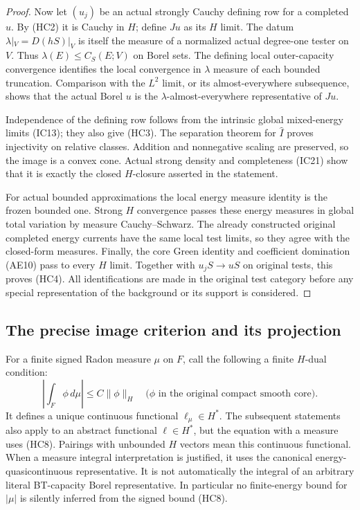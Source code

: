 \documentclass[11pt,a4paper]{article}
\numberwithin{equation}{section}
\theoremstyle{definition}
\theoremstyle{remark}
\begin{document}
\begin{proof}
Now let $(u_j)$ be an actual strongly Cauchy defining row for
a completed $u$. By (HC2) it is Cauchy in $H$; define $Ju$
as its $H$ limit. The datum $\lambda|_V=D(hS)|_V$ is itself
the measure of a normalized actual degree-one tester on $V$.
Thus $\lambda(E)\leq C_S(E;V)$ on Borel sets. The defining
local outer-capacity convergence identifies the local
convergence in $\lambda$ measure of each bounded truncation.
Comparison with the $L^2$ limit, or its almost-everywhere
subsequence, shows that the actual Borel $u$ is the
$\lambda$-almost-everywhere representative of $Ju$.

Independence of the defining row follows from the intrinsic
global mixed-energy limits (IC13); they also give (HC3).
The separation theorem for $\widehat I$ proves injectivity
on relative classes. Addition and nonnegative scaling are
preserved, so the image is a convex cone. Actual strong
density and completeness (IC21) show that it is exactly
the closed $H$-closure asserted in the statement.

For actual bounded approximations the local energy measure
identity is the frozen bounded one. Strong $H$ convergence
passes these energy measures in global total variation by
measure Cauchy--Schwarz. The already constructed original
completed energy currents have the same local test limits,
so they agree with the closed-form measures. Finally, the
core Green identity and coefficient domination (AE10) pass
to every $H$ limit. Together with $u_jS\to uS$ on original
tests, this proves (HC4). All identifications are made in
the original test category before any special representation
of the background or its support is considered.
\end{proof}

\subsection{The precise image criterion and its projection}

For a finite signed Radon measure $\mu$ on $F$, call the
following a finite $H$-dual condition:
\[
 \left|\int_F\phi\,d\mu\right|
             \leq C\|\phi\|_H
       \quad\bigl(\phi\text{ in the original compact smooth core}\bigr).
 \tag{HC8}
\]
It defines a unique continuous functional $\ell_\mu\in H^*$.
The subsequent statements also apply to an abstract functional
$\ell\in H^*$, but the equation with a measure uses (HC8).
Pairings with unbounded $H$ vectors mean this continuous
functional. When a measure integral interpretation is justified,
it uses the canonical energy-quasicontinuous representative.
It is not automatically the integral of an arbitrary literal
BT-capacity Borel representative. In particular no finite-energy
bound for $|\mu|$ is silently inferred from the signed bound
(HC8).
\end{document}
